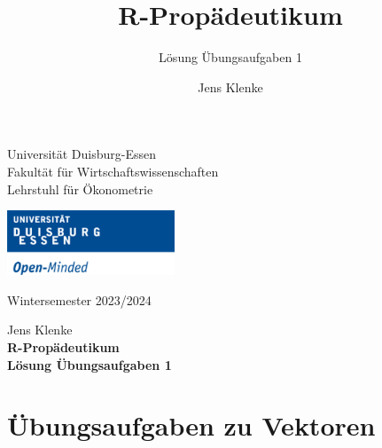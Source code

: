 \documentclass[12pt,a4paper]{article}
\title{R-Propädeutikum}
\subtitle{Lösung Übungsaufgaben 1}
\author{Jens Klenke}
\date{}
\begin{document}





\restoregeometry



\begin{minipage}{0.6\textwidth}
Universität Duisburg-Essen\\
Fakultät für Wirtschaftswissenschaften\\
Lehrstuhl für Ökonometrie\\
\end{minipage}

	\begin{flushright}
	\vspace{-3cm}
	\includegraphics*[width=5cm]{includes/duelogo_en.png}\\
	\vspace{.125cm}
	\end{flushright}
\hspace{-0.005cm}Wintersemester 2023/2024

\vspace{0.05cm}

\begin{center}
	\vspace{.25cm}
	Jens Klenke \hspace{.5cm}  \\
	\vspace{.25cm}
	\textbf{\Large{R-Propädeutikum}}\\
	\vspace{.25cm}
	\textbf{\large{Lösung Übungsaufgaben 1}}\\
	\vspace{.125cm}
\end{center}





\hypertarget{uxfcbungsaufgaben-zu-vektoren}{%
\section{Übungsaufgaben zu
Vektoren}\label{uxfcbungsaufgaben-zu-vektoren}}
\end{document}
